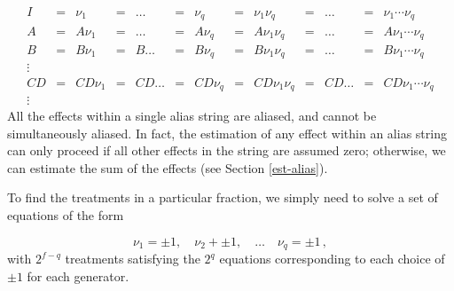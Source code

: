 \documentclass[
]{book}
\theoremstyle{definition}
\theoremstyle{definition}
\theoremstyle{definition}
\theoremstyle{definition}
\theoremstyle{remark}
\begin{document}
\[
 \begin{array}{ccccccccccccc}
 I & = & \nu_1 & = & \ldots & = & \nu_q & = & \nu_1\nu_q 
 & = & \ldots & = & \nu_1\cdots\nu_q \\
 A & = & A\nu_1 & = & \ldots & = & A\nu_q & = & A\nu_1\nu_q 
 & = & \ldots & = & A\nu_1\cdots\nu_q \\
 B & = & B\nu_1 & = & B\ldots & = & B\nu_q & = & B\nu_1\nu_q 
 & = & \ldots & = & B\nu_1\cdots\nu_q \\
 \vdots \\
 CD & = & CD\nu_1 & = & CD\ldots & = & CD\nu_q & = & CD\nu_1\nu_q 
 & = & CD\ldots & = & CD\nu_1\cdots\nu_q \\
 \vdots
 \end{array}
 \]
All the effects within a single alias string are aliased, and cannot be simultaneously aliased. In fact, the estimation of any effect within an alias string can only proceed if all other effects in the string are assumed zero; otherwise, we can estimate the sum of the effects (see Section \ref{est-alias}).

To find the treatments in a particular fraction, we simply need to solve a set of equations of the form

\[
\nu_1 = \pm 1, \quad \nu_2 + \pm 1, \quad \ldots \quad \nu_q = \pm 1\,,
\]
with \(2^{f-q}\) treatments satisfying the \(2^q\) equations corresponding to each choice of \(\pm 1\) for each generator.
\end{document}
